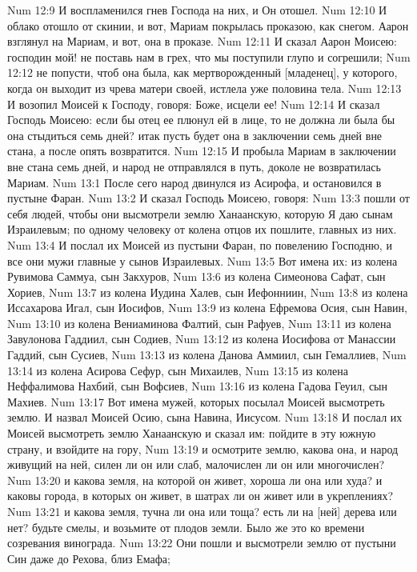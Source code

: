 Num 12:9  И воспламенился гнев Господа на них, и Он отошел.
Num 12:10  И облако отошло от скинии, и вот, Мариам покрылась проказою, как снегом. Аарон взглянул на Мариам, и вот, она в проказе.
Num 12:11  И сказал Аарон Моисею: господин мой! не поставь нам в грех, что мы поступили глупо и согрешили;
Num 12:12  не попусти, чтоб она была, как мертворожденный [младенец], у которого, когда он выходит из чрева матери своей, истлела уже половина тела.
Num 12:13  И возопил Моисей к Господу, говоря: Боже, исцели ее!
Num 12:14  И сказал Господь Моисею: если бы отец ее плюнул ей в лице, то не должна ли была бы она стыдиться семь дней? итак пусть будет она в заключении семь дней вне стана, а после опять возвратится.
Num 12:15  И пробыла Мариам в заключении вне стана семь дней, и народ не отправлялся в путь, доколе не возвратилась Мариам.
Num 13:1  После сего народ двинулся из Асирофа, и остановился в пустыне Фаран.
Num 13:2  И сказал Господь Моисею, говоря:
Num 13:3  пошли от себя людей, чтобы они высмотрели землю Ханаанскую, которую Я даю сынам Израилевым; по одному человеку от колена отцов их пошлите, главных из них.
Num 13:4  И послал их Моисей из пустыни Фаран, по повелению Господню, и все они мужи главные у сынов Израилевых.
Num 13:5  Вот имена их: из колена Рувимова Саммуа, сын Закхуров,
Num 13:6  из колена Симеонова Сафат, сын Хориев,
Num 13:7  из колена Иудина Халев, сын Иефонниин,
Num 13:8  из колена Иссахарова Игал, сын Иосифов,
Num 13:9  из колена Ефремова Осия, сын Навин,
Num 13:10  из колена Вениаминова Фалтий, сын Рафуев,
Num 13:11  из колена Завулонова Гаддиил, сын Содиев,
Num 13:12  из колена Иосифова от Манассии Гаддий, сын Сусиев,
Num 13:13  из колена Данова Аммиил, сын Гемаллиев,
Num 13:14  из колена Асирова Сефур, сын Михаилев,
Num 13:15  из колена Неффалимова Нахбий, сын Вофсиев,
Num 13:16  из колена Гадова Геуил, сын Махиев.
Num 13:17  Вот имена мужей, которых посылал Моисей высмотреть землю. И назвал Моисей Осию, сына Навина, Иисусом.
Num 13:18  И послал их Моисей высмотреть землю Ханаанскую и сказал им: пойдите в эту южную страну, и взойдите на гору,
Num 13:19  и осмотрите землю, какова она, и народ живущий на ней, силен ли он или слаб, малочислен ли он или многочислен?
Num 13:20  и какова земля, на которой он живет, хороша ли она или худа? и каковы города, в которых он живет, в шатрах ли он живет или в укреплениях?
Num 13:21  и какова земля, тучна ли она или тоща? есть ли на [ней] дерева или нет? будьте смелы, и возьмите от плодов земли. Было же это ко времени созревания винограда.
Num 13:22  Они пошли и высмотрели землю от пустыни Син даже до Рехова, близ Емафа;
